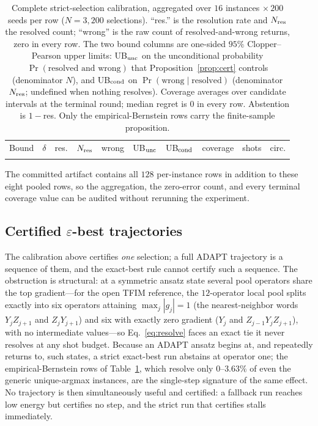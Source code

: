 \documentclass[aps,pra,reprint,superscriptaddress,nofootinbib,floatfix]{revtex4-2}
\begin{document}
\begin{table}[t]
\caption{Complete strict-selection calibration, aggregated over $16$ instances $\times\,200$ seeds per row ($N=3{,}200$ selections). ``res.'' is the resolution rate and $N_{\rm res}$ the resolved count; ``wrong'' is the raw count of resolved-and-wrong returns, zero in every row. The two bound columns are one-sided $95\%$ Clopper--Pearson upper limits: UB$_{\rm unc}$ on the unconditional probability $\Pr(\text{resolved and wrong})$ that Proposition~\ref{prop:cert} controls (denominator $N$), and UB$_{\rm cond}$ on $\Pr(\text{wrong}\mid\text{resolved})$ (denominator $N_{\rm res}$; undefined when nothing resolves). Coverage averages over candidate intervals at the terminal round; median regret is $0$ in every row. Abstention is $1-$res. Only the empirical-Bernstein rows carry the finite-sample proposition.}
\label{tab:calib}
\centering
\footnotesize
\begin{ruledtabular}
\begin{tabular}{llrrrrrrrr}
Bound & $\delta$ & res. & $N_{\rm res}$ & wrong & UB$_{\rm unc}$ & UB$_{\rm cond}$ & coverage & shots & circ.\\
\colrule

\end{tabular}
\end{ruledtabular}
\end{table}

The committed artifact contains all $128$ per-instance rows in addition to these eight pooled rows, so the aggregation, the zero-error count, and every terminal coverage value can be audited without rerunning the experiment.

\subsection{Certified $\varepsilon$-best trajectories}
\label{sec:res-certtraj}

The calibration above certifies \emph{one} selection; a full ADAPT trajectory is a sequence of them, and the exact-best rule cannot certify such a sequence. The obstruction is structural: at a symmetric ansatz state several pool operators share the top gradient---for the open TFIM reference, the $12$-operator local pool splits exactly into six operators attaining $\max_j|g_j|=1$ (the nearest-neighbor words $Y_jZ_{j+1}$ and $Z_jY_{j+1}$) and six with exactly zero gradient ($Y_j$ and $Z_{j-1}Y_jZ_{j+1}$), with no intermediate values---so Eq.~\eqref{eq:resolve} faces an exact tie it never resolves at any shot budget. Because an ADAPT ansatz begins at, and repeatedly returns to, such states, a strict exact-best run abstains at operator one; the empirical-Bernstein rows of Table~\ref{tab:calib}, which resolve only $0$--$3.63\%$ of even the generic unique-argmax instances, are the single-step signature of the same effect. No trajectory is then simultaneously useful and certified: a fallback run reaches low energy but certifies no step, and the strict run that certifies stalls immediately.
\end{document}
